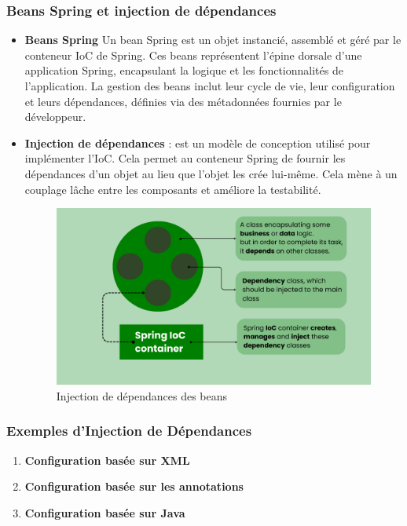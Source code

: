 \documentclass{article}
\begin{document}
\subsubsection{Beans Spring et injection de dépendances}
\begin{itemize}
    \item \textbf{Beans Spring}  
    Un bean Spring est un objet instancié, assemblé et géré par le conteneur IoC de Spring. Ces beans représentent l'épine dorsale d'une application Spring, encapsulant la logique et les fonctionnalités de l'application. La gestion des beans inclut leur cycle de vie, leur configuration et leurs dépendances, définies via des métadonnées fournies par le développeur.

    \item \textbf{Injection de dépendances} : est un modèle de conception utilisé pour implémenter l'IoC. Cela permet au conteneur Spring de fournir les dépendances d’un objet au lieu que l'objet les crée lui-même. Cela mène à un couplage lâche entre les composants et améliore la testabilité.

\begin{figure}[H]
    \centering
    \begin{framed}
        \includegraphics[width=0.9\linewidth]{images/dependency_injection.png}
    \end{framed}
    \caption{Injection de dépendances des beans}
    \label{fig:spring-ioc-container}
\end{figure}
\end{itemize}
\subsubsection{Exemples d'Injection de Dépendances}
\begin{enumerate} 
    \item \textbf{Configuration basée sur XML}\label{sec:ioc-xml-config}
    
    \item \textbf{Configuration basée sur les annotations}\label{sec:ioc-annotation-config}

    \item \textbf{Configuration basée sur Java}\label{sec:ioc-java-config}
\end{enumerate}
    
\end{document}
